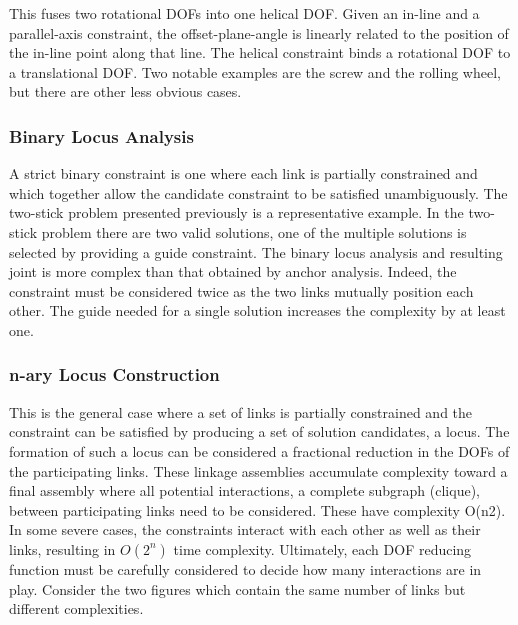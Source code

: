 \documentclass[]{report}
\begin{document}
This fuses two rotational DOFs into one helical DOF. 
Given an in-line and a parallel-axis constraint, 
the offset-plane-angle is linearly related to the position of 
the in-line point along that line. 
The helical constraint binds a rotational DOF to a translational DOF. 
Two notable examples are the screw and the rolling wheel, 
but there are other less obvious cases. 


\subsubsection{Binary Locus Analysis}

A strict binary constraint is one where each link is 
partially constrained and which together allow the candidate constraint to be satisfied unambiguously. 
The two-stick problem presented previously is a representative example. 
In the two-stick problem there are two valid solutions, 
one of the multiple solutions is selected by providing a guide constraint. 
The binary locus analysis and resulting joint is 
more complex than that obtained by anchor analysis. 
Indeed, the constraint must be considered twice as the two links mutually position each other. 
The guide needed for a single solution increases the complexity by at least one.

\subsubsection{n-ary Locus Construction}

This is the general case where a set of links is partially 
constrained and the constraint can be satisfied by producing a set of solution candidates, a locus. 
The formation of such a locus can be considered a 
fractional reduction in the DOFs of the participating links. 
These linkage assemblies accumulate complexity toward 
a final assembly where all potential interactions, 
a complete subgraph (clique), between participating links need to be considered. 
These have complexity O(n2). In some severe cases, 
the constraints interact with each other as well as their links, 
resulting in $O(2^n)$ time complexity. 
Ultimately, each DOF reducing function must be carefully 
considered to decide how many interactions are in play. 
Consider the two figures which contain the same number of links but different complexities.
\end{document}

